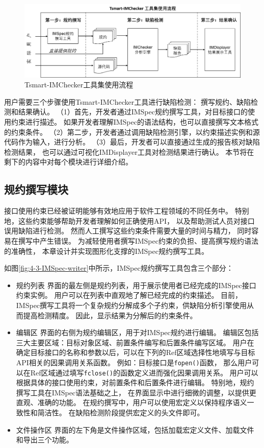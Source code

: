 \begin{figure}[t]
	\centering
	\includegraphics[width=\linewidth]{figures/cp4-overview.png}
	\caption{
		Tsmart-IMChecker工具集使用流程
	}
	\label{fig:4-3-overview}
\end{figure}

用户需要三个步骤使用Tsmart-IMChecker工具进行缺陷检测：
撰写规约、缺陷检测和结果确认。
（1）首先，开发者通过IMSpec规约撰写工具，对目标接口的使用约束进行描述。
如果开发者理解IMSpec的语法结构，也可以直接撰写文本格式的约束条件。
（2）第二步，开发者通过调用缺陷检测引擎，以约束描述实例和源代码作为输入，进行分析。
（3）最后，开发者可以直接通过生成的报告核对缺陷检测结果，
也可以通过可视化IMDisplayer工具对检测结果进行确认。
本节将在剩下的内容中对每个模块进行详细介绍。


\subsection{规约撰写模块}
接口使用约束已经被证明能够有效地应用于软件工程领域的不同任务中。
特别地，这些约束能够帮助开发者理解如何正确使用API，
以及帮助测试人员对接口误用缺陷进行检测。
然而人工撰写这些约束条件需要大量的时间与精力，
同时容易在撰写中产生错误。
为减轻使用者撰写IMSpec约束的负担、提高撰写规约语法的准确性，
本章设计并实现图形化支撑的IMSpec规约撰写工具。

如图\ref{fig:4-3-IMSpec-writer}中所示，IMSpec规约撰写工具包含三个部分：
\begin{itemize}
	\item {\kaishu 规约列表}
	界面的最左侧是规约列表，用于展示使用者已经完成的IMSpec接口约束实例。
	用户可以在列表中直观地了解已经完成的约束描述。
	目前，IMSpec撰写工具将一个复杂规约分解成多个子约束，供缺陷分析引擎使用从而提高检测精度。
	因此，显示结果为分解后的约束条件。
	\item {\kaishu 编辑区} 
	界面的右侧为规约编辑区，用于对IMSpec规约进行编辑。
	编辑区包括三大主要区域：目标对象区域、前置条件编写和后置条件编写区域。
	用户在确定目标接口的名称和参数以后，可以在下列的Ref区域选择性地填写与目标API相关的因果调用关系函数。
	例如：目标接口是\texttt{fopen()}函数，
	那么用户可以在Ref区域通过填写\texttt{fclose()}的函数定义进而强化因果调用关系。
	用户可以根据具体的接口使用约束，对前置条件和后置条件进行编辑。
	特别地，规约撰写工具在IMSpec语法基础之上，
	在界面显示中进行细微的调整，以提供更直观、准确的功能。
	在规约撰写中，用户可以使用宏定义以保持程序语义一致性和简洁性。
	在缺陷检测阶段提供宏定义的头文件即可。
	\item {\kaishu 文件操作区} 
	界面的左下角是文件操作区域，包括加载宏定义文件、加载文件和导出三个功能。
	
\end{itemize}

